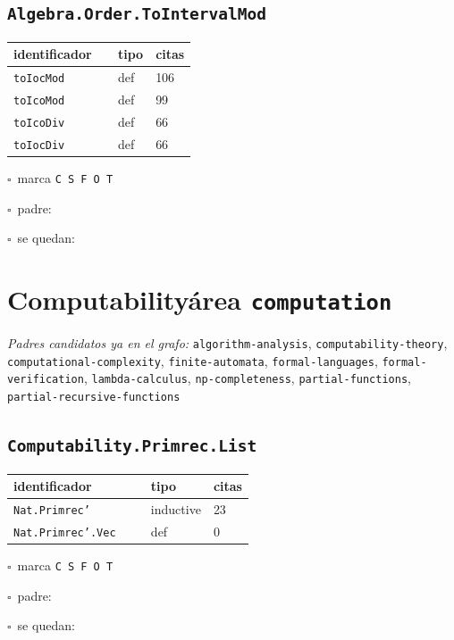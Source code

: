 \documentclass[10pt,a4paper]{article}
\begin{document}
\subsection*{\texttt{Algebra.Order.ToIntervalMod}}
\noindent\begin{minipage}{0.56\linewidth}\small\begin{tabular}{@{}>{\raggedright\arraybackslash}p{0.58\linewidth}ll@{}}\toprule
identificador & tipo & citas\\\midrule
\texttt{toIocMod} & def & 106\\
\texttt{toIcoMod} & def & 99\\
\texttt{toIcoDiv} & def & 66\\
\texttt{toIocDiv} & def & 66\\
\bottomrule\end{tabular}\end{minipage}\hfill\begin{minipage}{0.40\linewidth}\small$\square$~marca \texttt{C S F O T}\par\smallskip$\square$~padre: \dotfill\par\smallskip$\square$~se quedan: \dotfill\par\end{minipage}\par\medskip
\section{Computability\hfill{\normalsize\normalfont área \texttt{computation}}}
\begin{sloppypar}\noindent\small\textit{Padres candidatos ya en el grafo:} \texttt{algorithm-analysis}, \texttt{computability-theory}, \texttt{computational-complexity}, \texttt{finite-automata}, \texttt{formal-languages}, \texttt{formal-verification}, \texttt{lambda-calculus}, \texttt{np-completeness}, \texttt{partial-functions}, \texttt{partial-recursive-functions}\end{sloppypar}
\subsection*{\texttt{Computability.Primrec.List}}
\noindent\begin{minipage}{0.56\linewidth}\small\begin{tabular}{@{}>{\raggedright\arraybackslash}p{0.58\linewidth}ll@{}}\toprule
identificador & tipo & citas\\\midrule
\texttt{Nat.\allowbreak{}Primrec'} & inductive & 23\\
\texttt{Nat.\allowbreak{}Primrec'.\allowbreak{}Vec} & def & 0\\
\bottomrule\end{tabular}\end{minipage}\hfill\begin{minipage}{0.40\linewidth}\small$\square$~marca \texttt{C S F O T}\par\smallskip$\square$~padre: \dotfill\par\smallskip$\square$~se quedan: \dotfill\par\end{minipage}\par\medskip
\end{document}
